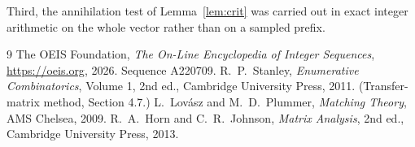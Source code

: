 \documentclass[11pt,a4paper]{article}
\theoremstyle{plain}
\theoremstyle{definition}
\begin{document}
Third, the annihilation test of Lemma~\ref{lem:crit} was carried out in exact integer
arithmetic on the whole vector rather than on a sampled prefix.

\begin{thebibliography}{9}
 The OEIS Foundation, \emph{The On-Line Encyclopedia of Integer
Sequences}, \url{https://oeis.org}, 2026. Sequence A220709.
 R.~P.~Stanley, \emph{Enumerative Combinatorics}, Volume 1, 2nd ed.,
Cambridge University Press, 2011. (Transfer-matrix method, Section 4.7.)
 L.~Lov\'asz and M.~D.~Plummer, \emph{Matching Theory}, AMS Chelsea,
2009.
 R.~A.~Horn and C.~R.~Johnson, \emph{Matrix Analysis}, 2nd ed., Cambridge
University Press, 2013.
\end{thebibliography}
\end{document}
